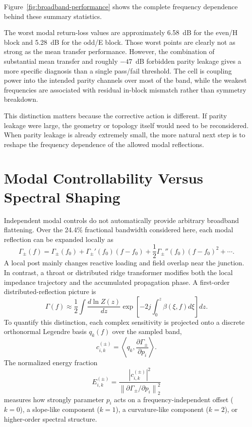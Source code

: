 \documentclass[journal]{IEEEtran}
\begin{document}
Figure~\ref{fig:broadband-performance} shows the complete frequency dependence behind these summary statistics.



The worst modal return-loss values are approximately 6.58~dB for the even/H block and 5.28~dB for the odd/E block.
Those worst points are clearly not as strong as the mean transfer performance.
However, the combination of substantial mean transfer and roughly $-47$~dB forbidden parity leakage gives a more specific diagnosis than a single pass/fail threshold.
The cell is coupling power into the intended parity channels over most of the band, while the weakest frequencies are associated with residual in-block mismatch rather than symmetry breakdown.

This distinction matters because the corrective action is different.
If parity leakage were large, the geometry or topology itself would need to be reconsidered.
When parity leakage is already extremely small, the more natural next step is to reshape the frequency dependence of the allowed modal reflections.

\section{Modal Controllability Versus Spectral Shaping}
Independent modal controls do not automatically provide arbitrary broadband flattening.
Over the 24.4\% fractional bandwidth considered here, each modal reflection can be expanded locally as
\begin{equation}
\Gamma_\pm(f)=
\Gamma_\pm(f_0)
+\Gamma_\pm'(f_0)(f-f_0)
+\frac12\Gamma_\pm''(f_0)(f-f_0)^2+\cdots.
\end{equation}
A local post mainly changes reactive loading and field overlap near the junction.
In contrast, a throat or distributed ridge transformer modifies both the local impedance trajectory and the accumulated propagation phase.
A first-order distributed-reflection picture is
\begin{equation}
\Gamma(f)\approx
\frac12\int
\frac{d\ln Z(z)}{dz}
\exp\!\left[
-2j\int_0^z\beta(\xi,f)d\xi
\right]dz.
\end{equation}
To quantify this distinction, each complex sensitivity is projected onto a discrete orthonormal Legendre basis $q_k(f)$ over the sampled band,
\begin{equation}
c_{i,k}^{(\pm)}
=
\left\langle
q_k,
\frac{\partial\Gamma_\pm}{\partial p_i}
\right\rangle .
\end{equation}
The normalized energy fraction
\begin{equation}
E_{i,k}^{(\pm)}
=
\frac{|c_{i,k}^{(\pm)}|^2}
{\left\|\partial\Gamma_\pm/\partial p_i\right\|_2^2}
\end{equation}
measures how strongly parameter $p_i$ acts on a frequency-independent offset ($k=0$), a slope-like component ($k=1$), a curvature-like component ($k=2$), or higher-order spectral structure.
\end{document}
